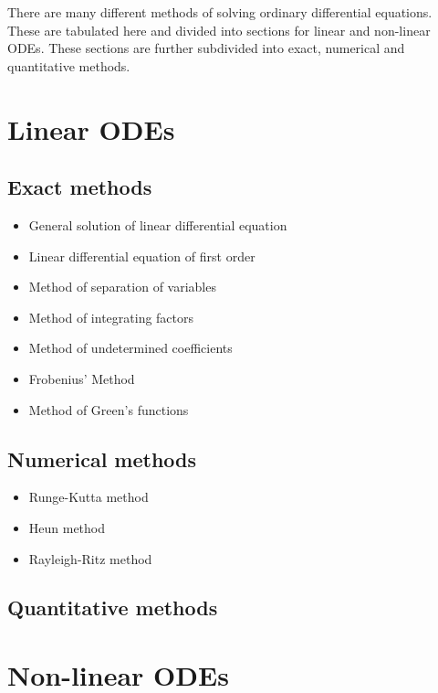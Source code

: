 \documentclass[12pt]{article}
\begin{document}
There are many different methods of solving ordinary differential equations. These are tabulated here and divided into sections for linear and non-linear ODEs. These sections are further subdivided into exact, numerical and quantitative methods.
\section{Linear ODEs}
\subsection{Exact methods}
\begin{itemize}
\item General solution of linear differential equation
\item Linear differential equation of first order
\item Method of separation of variables
\item Method of integrating factors
\item Method of undetermined coefficients
\item Frobenius' Method
\item Method of Green's functions
\end{itemize}
\subsection{Numerical methods}
\begin{itemize}
\item Runge-Kutta method
\item Heun method
\item Rayleigh-Ritz method
\end{itemize}
\subsection{Quantitative methods}
\section{Non-linear ODEs}
\end{document}
